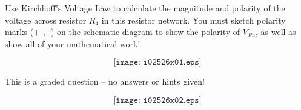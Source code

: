 

Use Kirchhoff's Voltage Law to calculate the magnitude and polarity of the voltage across resistor $R_4$ in this resistor network.  You must sketch polarity marks (+ , -) on the schematic diagram to show the polarity of $V_{R4}$, as well as show all of your mathematical work!

$$\texttt{[image: i02526x01.eps]}$$

\vfil 

\eject






This is a graded question -- no answers or hints given!







$$\texttt{[image: i02526x02.eps]}$$




